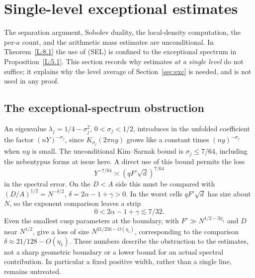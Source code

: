 \documentclass[10pt,reqno]{amsart}
\theoremstyle{definition}
\numberwithin{equation}{section}
\begin{document}
\section{Single-level exceptional estimates}\label{sec:uncond}
The separation argument, Sobolev duality, the local-density computation,
the per-$a$ count, and the arithmetic mass estimates are unconditional.
In Theorem~\ref{L:8.1} the use of (SEL) is confined to the exceptional
spectrum in Proposition~\ref{L:5.1}. This section records why estimates
\emph{at a single level} do not suffice; it explains why the level average
of Section~\ref{sec:exc} is needed, and is not used in any proof.

\subsection{The exceptional-spectrum obstruction}
An eigenvalue $\lambda_j=1/4-\sigma_j^2$, $0<\sigma_j<1/2$, introduces
in the unfolded coefficient the factor $(nY)^{-\sigma_j}$, since
$K_{\sigma_j}(2\pi ny)$ grows like a constant times $(ny)^{-\sigma_j}$
when $ny$ is small.  The unconditional Kim--Sarnak bound
\cite[Appendix~2]{KS} is $\sigma_j\leq7/64$, including the
nebentypus forms at issue here.  A direct use of this bound permits the
loss
\begin{equation}\label{C:eq:exceptional-loss}
 Y^{-7/64}\asymp(qF'\sqrt d)^{7/64}
\end{equation}
in the spectral error.  On the $D<A$ side this must be compared with
$(D/A)^{1/2}=N^{-\delta/2}$, $\delta=2\alpha-1+\gamma>0$.
In the worst cells $qF'\sqrt d$ has size about $N$, so the exponent
comparison leaves a strip
\[
 0<2\alpha-1+\gamma\lesssim7/32.
\]
Even the smallest cusp parameters at the boundary, with
$F'\gg N^{1/2-3\eta_1}$ and $D$ near $N^{1/2}$, give a loss of
size $N^{21/256-O(\eta_1)}$, corresponding to the comparison
$\delta\approx21/128-O(\eta_1)$.  These numbers describe the
obstruction to the estimates, not a sharp geometric boundary or a
lower bound for an actual spectral contribution.  In particular a
fixed positive width, rather than a single line, remains untreated.
\end{document}
